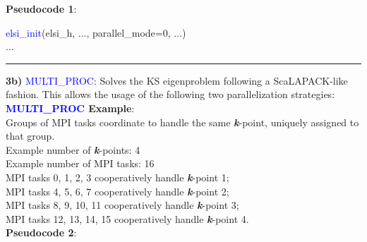 \documentclass{report}
\begin{document}
\textbf{Pseudocode 1}:\\

\begin{algorithm}[H]
\textcolor{blue}{elsi\_init}(elsi\_h, ..., parallel\_mode=0, ...)\\
...
\hspace{0.3cm}\\
\end{algorithm}

\bigskip
\noindent\rule{18cm}{0.4pt}

\bigskip
\textbf{3b)} \textcolor{blue}{MULTI\_PROC}:  Solves the KS eigenproblem following a ScaLAPACK-like fashion.  This allows the usage of the following two parallelization strategies:\\

\textbf{\textcolor{blue}{MULTI\_PROC} Example}:\\

Groups of MPI tasks coordinate to handle the same \textbf{\textit{k}}-point, uniquely assigned to that group.\\

Example number of \textbf{\textit{k}}-points:  4\\
Example number of MPI tasks:  16\\

MPI tasks  0,  1,  2,  3 cooperatively handle \textbf{\textit{k}}-point 1;\\
MPI tasks  4,  5,  6,  7 cooperatively handle \textbf{\textit{k}}-point 2;\\
MPI tasks  8,  9, 10, 11 cooperatively handle \textbf{\textit{k}}-point 3;\\
MPI tasks 12, 13, 14, 15 cooperatively handle \textbf{\textit{k}}-point 4.\\

\textbf{Pseudocode 2}:\\
\end{document}
